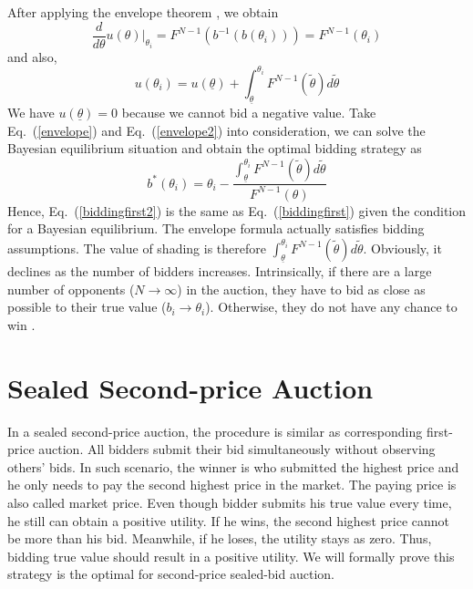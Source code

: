 After applying the envelope theorem \cite{milgrompaililyasegal2002}, we obtain
\begin{equation}
\frac{d}{d \theta}u(\theta)|_{\theta_i}=F^{N-1}(b^{-1}(b(\theta_i)))=F^{N-1}(\theta_i)
\end{equation}
and also,
\begin{equation}
\label{envelope2}
u(\theta_i)=u(\underline{\theta})+\int_{\underline{\theta}}^{\theta_i}F^{N-1}(\tilde{\theta})d\tilde{\theta}
\end{equation}
We have $u(\underline{\theta})=0$ because we cannot bid a negative value. Take Eq.~(\ref{envelope}) and Eq.~(\ref{envelope2}) into consideration, we can solve the Bayesian equilibrium situation and obtain the optimal bidding strategy as
\begin{equation}
\label{biddingfirst2}
b^{*}(\theta_i)=\theta_i-\frac{\int_{\underline{\theta}}^{\theta_i}F^{N-1}(\widetilde{\theta})d\widetilde{\theta}}{F^{N-1}(\theta)}
\end{equation}
Hence, Eq.~(\ref{biddingfirst2}) is the same as Eq.~(\ref{biddingfirst}) given the condition for a Bayesian equilibrium. The envelope formula actually satisfies bidding assumptions. The value of shading is therefore $\int_{\underline{\theta}}^{\theta_i}F^{N-1}(\widetilde{\theta})d\widetilde{\theta}$. Obviously, it declines as the number of bidders increases. Intrinsically, if there are a large number of opponents ($N \rightarrow \infty $) in the auction, they have to bid as close as possible to their true value ($b_i \rightarrow \theta_i$). Otherwise, they do not have any chance to win \cite{robertwilson1977}.

\section{Sealed Second-price Auction}
In a sealed second-price auction, the procedure is similar as corresponding first-price auction. All bidders submit their bid simultaneously without observing others' bids. In such scenario, the winner is who submitted the highest price and he only needs to pay the second highest price in the market. The paying price is also called market price. Even though bidder submits his true value every time, he still can obtain a positive utility. If he wins, the second highest price cannot be more than his bid. Meanwhile, if he loses, the utility stays as zero. Thus, bidding true value should result in a positive utility. We will formally prove this strategy is the optimal for second-price sealed-bid auction.

